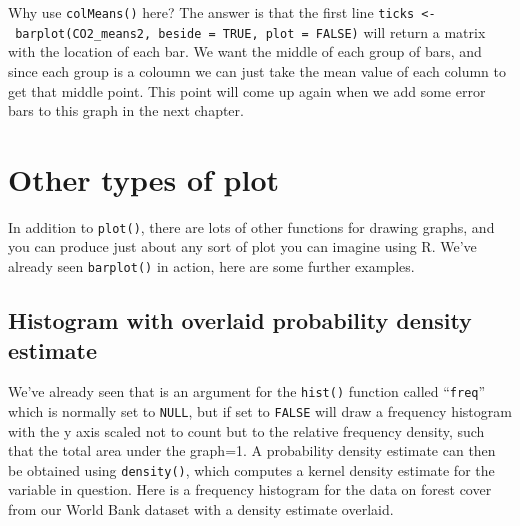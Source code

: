 \documentclass[
]{book}
\newenvironment{Shaded}{\begin{snugshade}}{\end{snugshade}}
\newcommand{\DataTypeTok}[1]{\textcolor[rgb]{0.13,0.29,0.53}{#1}}
\newcommand{\DecValTok}[1]{\textcolor[rgb]{0.00,0.00,0.81}{#1}}
\newcommand{\KeywordTok}[1]{\textcolor[rgb]{0.13,0.29,0.53}{\textbf{#1}}}
\newcommand{\NormalTok}[1]{#1}
\newcommand{\OperatorTok}[1]{\textcolor[rgb]{0.81,0.36,0.00}{\textbf{#1}}}
\newcommand{\OtherTok}[1]{\textcolor[rgb]{0.56,0.35,0.01}{#1}}
\newcommand{\StringTok}[1]{\textcolor[rgb]{0.31,0.60,0.02}{#1}}
\begin{document}
Why use \texttt{colMeans()} here? The answer is that the first line \texttt{ticks\ \textless{}-\ barplot(CO2\_means2,\ beside\ =\ TRUE,\ plot\ =\ FALSE)} will return a matrix with the location of each bar. We want the middle of each group of bars, and since each group is a coloumn we can just take the mean value of each column to get that middle point. This point will come up again when we add some error bars to this graph in the next chapter.

\hypertarget{other-types-of-plot}{%
\section{Other types of plot}\label{other-types-of-plot}}

In addition to \texttt{plot()}, there are lots of other functions for drawing graphs, and you can produce just about any sort of plot you can imagine using R. We've already seen \texttt{barplot()} in action, here are some further examples.

\hypertarget{histogram-with-overlaid-probability-density-estimate}{%
\subsection{Histogram with overlaid probability density estimate}\label{histogram-with-overlaid-probability-density-estimate}}

We've already seen that is an argument for the \texttt{hist()} function called ``\texttt{freq}'' which is normally set to \texttt{NULL}, but if set to \texttt{FALSE} will draw a frequency histogram with the y axis scaled not to count but to the relative frequency density, such that the total area under the graph=1. A probability density estimate can then be obtained using \texttt{density()}, which computes a kernel density estimate for the variable in question. Here is a frequency histogram for the data on forest cover from our World Bank dataset with a density estimate overlaid.

\begin{Shaded}
\end{Shaded}
\end{document}
